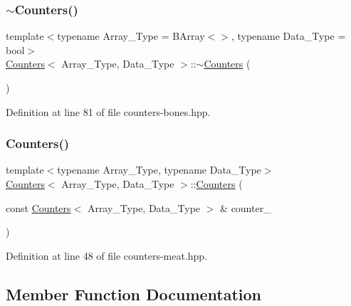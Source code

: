 \subsubsection{\texorpdfstring{$\sim$\+Counters()}{~Counters()}}
{\footnotesize\ttfamily template$<$typename Array\+\_\+\+Type = B\+Array$<$$>$, typename Data\+\_\+\+Type = bool$>$ \\
\hyperlink{class_counters}{Counters}$<$ Array\+\_\+\+Type, Data\+\_\+\+Type $>$\+::$\sim$\hyperlink{class_counters}{Counters} (\begin{DoxyParamCaption}{ }\end{DoxyParamCaption})\hspace{0.3cm}{\ttfamily [inline]}}



Definition at line 81 of file counters-\/bones.\+hpp.

\mbox{\label{class_counters_a178c0267c1f52a36e10e9d257a21a224}} 
\subsubsection{\texorpdfstring{Counters()}{Counters()}\hspace{0.1cm}{\footnotesize\ttfamily [2/2]}}
{\footnotesize\ttfamily template$<$typename Array\+\_\+\+Type, typename Data\+\_\+\+Type$>$ \\
\hyperlink{class_counters}{Counters}$<$ Array\+\_\+\+Type, Data\+\_\+\+Type $>$\+::\hyperlink{class_counters}{Counters} (\begin{DoxyParamCaption}\item[{const \hyperlink{class_counters}{Counters}$<$ Array\+\_\+\+Type, Data\+\_\+\+Type $>$ \&}]{counter\+\_\+ }\end{DoxyParamCaption})\hspace{0.3cm}{\ttfamily [inline]}}



Definition at line 48 of file counters-\/meat.\+hpp.



\subsection{Member Function Documentation}
\mbox{\label{class_counters_a5b5dafc7a3e0eedae400457f69937613}} 
